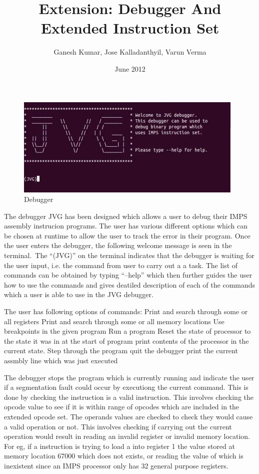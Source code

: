 \documentclass[12pt,a4paper,oneside]{report}
\begin{document}
\title{Extension: Debugger And Extended Instruction Set}
\author{Ganesh Kumar, Jose Kalladanthyil, Varun Verma}
\date{June 2012}
\maketitle

\begin{figure}[htb]
\centering
\includegraphics{graphics.jpg}
\caption{Debugger}
\label{fig:awesome_image}
\end{figure}

The debugger JVG has been designed which allows a user to debug their IMPS assembly instrucion programs. The user has various different options which can be chosen at runtime to allow the user to track the error in their program. Once the user enters the debugger, the following welcome message is seen in the terminal.\
The “(JVG)” on the terminal indicates that the debugger is waiting for the user input, i.e. the command from user to carry out a a task. The list of commands can be obtained by typing “--help” which then further guides the user how to use the commands and gives deatiled description of each of the commands which a user is able to use in the JVG debugger.  

The user has following options of commands:
Print and search through some or all registers
Print and search through some or all memory locations
Use breakpoints in the given program
Run a program
Reset the state of processor to the state it was in at the start of program
print contents of the processor in the current state.
Step through the program
quit the debugger
print the current assmbly line which was just executed

The debugger stops the program which is currently running and indicate the user if a segmentation fault could occur by executiong the current command. This is done by checking the instruction is a valid instruction. This involves checking the opcode value to see if it is within range of opcodes which are included in the extended opcode set. The operands values are checked to check they would cause a valid operation or not. This involves checking if carrying out the current operation would result in reading an invalid register or invalid memory location. For eg, if a instruction is trying to load a into register 1 the value stored at memory location 67000 which does not exists, or reading the value of  which is inexistent since an IMPS processor only has 32 general purpose registers.
\end{document}

